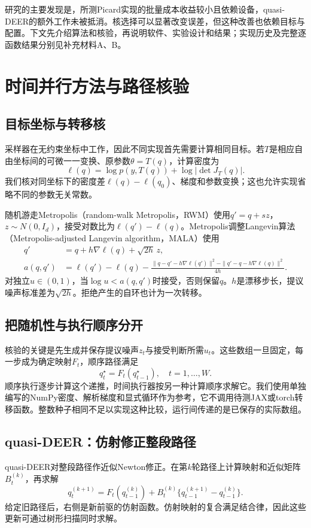 \documentclass[UTF8,fontset=fandol,zihao=-4]{ctexart}
\begin{document}
研究的主要发现是，所测Picard实现的批量成本收益较小且依赖设备，quasi-DEER的额外工作未被抵消。核选择可以显著改变误差，但这种改善也依赖目标与配置。下文先介绍算法和核验，再说明软件、实验设计和结果；实现历史及完整逐函数结果分别见补充材料A、B。

\section{时间并行方法与路径核验}
\subsection{目标坐标与转移核}
采样器在无约束坐标中工作，因此不同实现首先需要计算相同目标。若$T$是相应自由坐标间的可微一一变换、原参数$\theta=T(q)$，计算密度为
\begin{equation}
\ell(q)=\log p(y,T(q))+\log|\det J_T(q)|.
\end{equation}
我们核对同坐标下的密度差$\ell(q)-\ell(q_0)$、梯度和参数变换；这也允许实现省略不同的参数无关常数。

随机游走Metropolis（random-walk Metropolis，RWM）使用$q'=q+sz$，$z\sim N(0,I_d)$，接受对数比为$\ell(q')-\ell(q)$。Metropolis调整Langevin算法（Metropolis-adjusted Langevin algorithm，MALA）使用
\begin{align}
q'&=q+h\nabla\ell(q)+\sqrt{2h}\,z,\\
a(q,q')&=\ell(q')-\ell(q)-\frac{\|q-q'-h\nabla\ell(q')\|^2-\|q'-q-h\nabla\ell(q)\|^2}{4h}.
\end{align}
对独立$u\in(0,1)$，当$\log u<a(q,q')$时接受，否则保留$q$。$h$是漂移步长，提议噪声标准差为$\sqrt{2h}$。拒绝产生的自环也计为一次转移。

\subsection{把随机性与执行顺序分开}
核验的关键是先生成并保存提议噪声$z_t$与接受判断所需$u_t$。这些数组一旦固定，每一步成为确定映射$F_t$，顺序路径满足
\begin{equation}\label{eq:recurrence}
q_t^\star=F_t(q_{t-1}^\star),\quad t=1,\ldots,W.
\end{equation}
顺序执行逐步计算这个递推，时间执行器按另一种计算顺序求解它。我们使用单独编写的NumPy密度、解析梯度和显式循环作为参考，它不调用待测JAX或torch转移函数。整数种子相同不足以实现这种比较，运行间传递的是已保存的实际数组。

\subsection{quasi-DEER：仿射修正整段路径}
quasi-DEER对整段路径作近似Newton修正。在第$k$轮路径上计算映射和近似矩阵$B_t^{(k)}$，再求解
\begin{equation}\label{eq:deer}
q_t^{(k+1)}=F_t(q_{t-1}^{(k)})+
B_t^{(k)}\{q_{t-1}^{(k+1)}-q_{t-1}^{(k)}\}.
\end{equation}
给定旧路径后，右侧是新前驱的仿射函数。仿射映射的复合满足结合律，因此这些更新可通过树形扫描同时求解。
\end{document}
